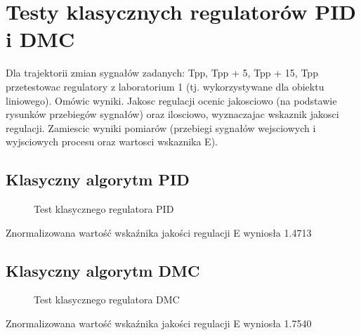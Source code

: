 \section{Testy klasycznych regulatorów PID i DMC}
\label{lab:zad3}

Dla trajektorii zmian sygnałów zadanych: Tpp, Tpp + 5, Tpp + 15, Tpp przetestowac
regulatory z laboratorium 1 (tj. wykorzystywane dla obiektu liniowego). Omówic wyniki.
Jakosc regulacji ocenic jakosciowo (na podstawie rysunków przebiegów sygnałów)
oraz ilosciowo, wyznaczajac wskaznik jakosci regulacji. Zamiescic wyniki pomiarów
(przebiegi sygnałów wejsciowych i wyjsciowych procesu oraz wartosci wskaznika E).



\subsection{Klasyczny algorytm PID}
\label{lab:zad3:PID}

\begin{figure}[H] 
   \centering
   
   \caption{Test klasycznego regulatora PID}
   \label{lab:zad3:PID:figure}
\end{figure}

Znormalizowana wartość wskaźnika jakości regulacji E wyniosła \num{1.4713}
\newpage

\subsection{Klasyczny algorytm DMC}
\label{lab:zad3:DMC}

\begin{figure}[H] 
    \centering
    
    \caption{Test klasycznego regulatora DMC}
    \label{lab:zad3:DMC:figure}
\end{figure}

Znormalizowana wartość wskaźnika jakości regulacji E wyniosła \num{1.7540}


\newpage
